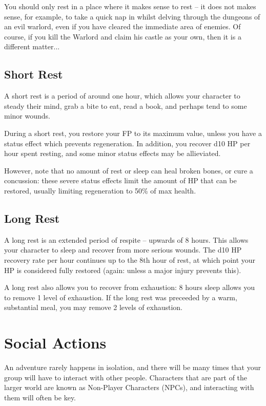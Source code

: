 You should only rest in a place where it makes sense to rest – it does not makes sense, for example, to take a quick nap in whilst delving through the dungeons of an evil warlord, even if you have cleared the immediate area of enemies. Of course, if you kill the Warlord and claim his castle as your own, then it is a different matter...

\subsection{Short Rest}

A short rest is a period of around one hour, which allows your character to steady their mind, grab a bite to eat, read a book, and perhaps tend to some minor wounds.

During a short rest, you restore your FP to its maximum value, unless you have a status effect which prevents regeneration. In addition, you recover d10 HP per hour spent resting, and some minor status effects may be allieviated. 

However, note that no amount of rest or sleep can heal broken bones, or cure a concussion: these severe status effects limit the amount of HP that can be restored, usually limiting regeneration to 50\% of max health. 

\subsection{Long Rest}

A long rest is an extended period of respite -- upwards of 8 hours. This allows your character to sleep and recover from more serious wounds. The d10 HP recovery rate per hour continues up to the 8th hour of rest, at which point your HP is considered fully restored (again: unless a major injury prevents this). 

A long rest also allows you to recover from exhaustion: 8 hours sleep allows you to remove 1 level of exhaustion. If the long rest was preceeded by a warm, substantial meal, you may remove 2 levels of exhaustion. 

\section{Social Actions}

An adventure rarely happens in isolation, and there will be many times that your group will have to interact with other people. Characters that are part of the larger world are known as Non-Player Characters (NPCs), and interacting with them will often be key. 

